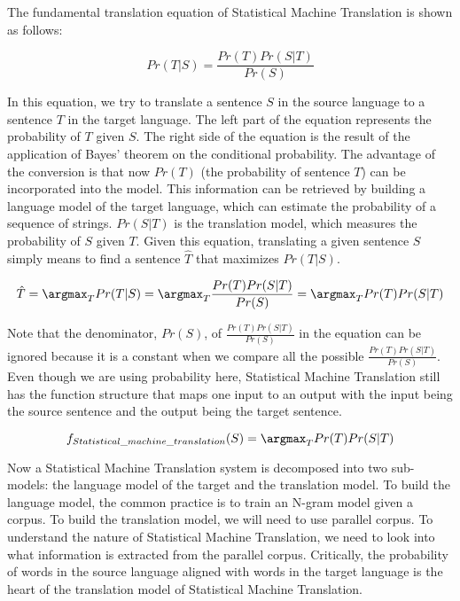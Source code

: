 The fundamental translation equation of Statistical Machine Translation is shown as follows:

\begin{equation}
Pr(T|S)=\frac{Pr(T)Pr(S|T)}{Pr(S)}
\end{equation}

In this equation, we try to translate a sentence $S$ in the source language to a sentence $T$ in the target language. The left part of the equation represents the probability of $T$ given $S$. 
The right side of the equation is the result of the application of Bayes' theorem on the conditional probability. 
The advantage of the conversion is that now $Pr(T)$ (the probability of sentence $T$) can be incorporated into the model. 
This information can be retrieved by building a language model of the target language, which can estimate the probability of a sequence of strings. $Pr(S|T)$ is the translation model, which measures the probability of $S$ given $T$. 
Given this equation, translating a given sentence $S$ simply means to find a sentence $\hat{T}$ that maximizes $Pr(T|S)$.   

\begin{equation}
\hat{T}= \argmax_{T} Pr(T|S) = \argmax_{T} \frac{Pr(T)Pr(S|T)}{Pr(S)} = \argmax_{T} Pr(T)Pr(S|T)
\end{equation}

Note that the denominator, $Pr(S)$, of $\frac{Pr(T)Pr(S|T)}{Pr(S)}$ in the equation can be ignored because it is a constant when we compare all the possible $\frac{Pr(T)Pr(S|T)}{Pr(S)}$. Even though we are using probability here, Statistical Machine Translation still has the function structure that maps one input to an output with the input being the source sentence and the output being the target sentence. 

\begin{equation}
f_{Statistical\_machine\_translation}(S)=\argmax_{T} Pr(T)Pr(S|T)
\end{equation}

Now a Statistical Machine Translation system is decomposed into two sub-models: the language model of the target and the translation model. 
To build the language model, the common practice is to train an N-gram model given a corpus. 
To build the translation model, we will need to use parallel corpus. 
To understand the nature of Statistical Machine Translation, we need to look into what information is extracted from the parallel corpus. Critically, the probability of words in the source language aligned with words in the target language is the heart of the translation model of Statistical Machine Translation. 

